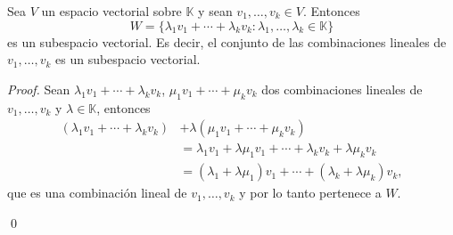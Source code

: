 \documentclass{beamer} %
\newcommand{\K}{\mathbb K}
\begin{document}
\begin{comment}
            Ahora bien,  como $W$ es subespacio, $\lambda_iw_i \in W$ para $1\le i \le k$. 
            
            \vskip .2cm
            Por un argumento inductivo, como $W$  es subespacio, no es difícil probar que la suma de $k$ términos en $W$ es un elemento de $W$, por lo tanto $\lambda_1w_1+\cdots+\lambda_kw_k \in W$. 
            
            \qed
    \end{demostracion}
            
\end{frame}

\end{comment}                    
    

\begin{frame}

\begin{teorema}
    Sea $V$ un espacio vectorial sobre $\K$ y sean $v_1,\ldots,v_k \in V$. Entonces
    $$
    W = \{\lambda_1v_1+\cdots+\lambda_kv_k: \lambda_1,\ldots,\lambda_k \in \K \}
    $$
    es un subespacio vectorial. Es decir,  el conjunto de las combinaciones lineales de $v_1,\ldots,v_k$ es un subespacio vectorial.
    \end{teorema}  \pause
    \begin{proof}  \pause
                Sean $\lambda_1v_1+\cdots+\lambda_kv_k$, $\mu_1v_1+\cdots+\mu_kv_k$ dos combinaciones lineales de $v_1,\ldots,v_k$ y $\lambda \in \K$, entonces 
            \begin{align*}
                (\lambda_1v_1+\cdots+\lambda_kv_k)&+\lambda (\mu_1v_1+\cdots+\mu_kv_k) \\&=  \lambda_1v_1+\lambda\mu_1v_1+\cdots+\lambda_kv_k+\lambda\mu_kv_k\\
                &= (\lambda_1+\lambda\mu_1)v_1+\cdots+(\lambda_k+\lambda\mu_k)v_k,
            \end{align*}
            que es  una combinación lineal de  $v_1,\ldots,v_k$ y por lo tanto pertenece a $W$. 
            
            \qed
    \end{proof}
    
\end{frame}

        
\end{document}
